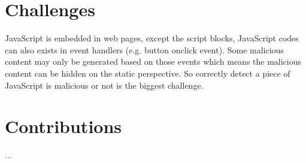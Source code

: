 \section{Challenges}
JavaScript is embedded in web pages, except the script blocks, JavaScript codes can also exists in event handlers (e.g. button onclick event). Some malicious content may only be generated based on those events which means the malicious content can be hidden on the static perspective. So correctly detect a piece of JavaScript is malicious or not is the biggest challenge.
\section{Contributions}
...